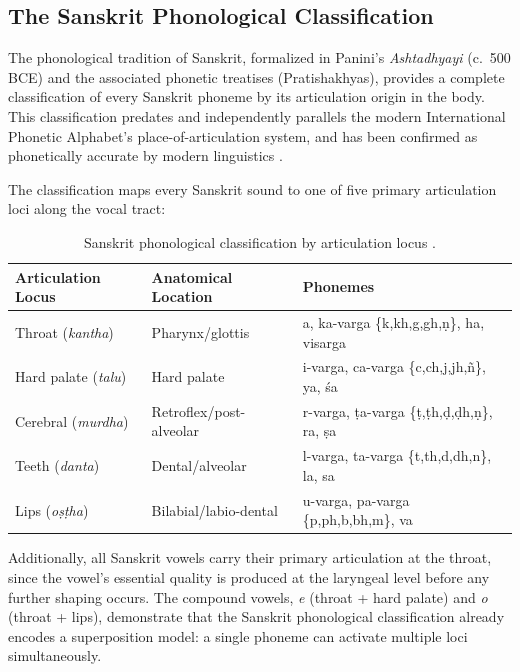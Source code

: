 \documentclass[12pt]{article}
\begin{document}
\subsection{The Sanskrit Phonological Classification}

The phonological tradition of Sanskrit, formalized in Panini's \textit{Ashtadhyayi} (c.\ 500 BCE) \cite{cardona1997} and the associated phonetic treatises (Pratishakhyas), provides a complete classification of every Sanskrit phoneme by its articulation origin in the body. This classification predates and independently parallels the modern International Phonetic Alphabet's place-of-articulation system, and has been confirmed as phonetically accurate by modern linguistics \cite{allen1953}.

The classification maps every Sanskrit sound to one of five primary articulation loci along the vocal tract:

\begin{table}[htbp]
\centering
\renewcommand{\arraystretch}{1.3}
\begin{tabular}{lll}
\toprule
\textbf{Articulation Locus} & \textbf{Anatomical Location} & \textbf{Phonemes} \\
\midrule
Throat (\textit{kantha}) & Pharynx/glottis & a, ka-varga \{k,kh,g,gh,\d{n}\}, ha, visarga \\
Hard palate (\textit{talu}) & Hard palate & i-varga, ca-varga \{c,ch,j,jh,\~{n}\}, ya, \'{s}a \\
Cerebral (\textit{murdha}) & Retroflex/post-alveolar & r-varga, \d{t}a-varga \{\d{t},\d{t}h,\d{d},\d{d}h,\d{n}\}, ra, \d{s}a \\
Teeth (\textit{danta}) & Dental/alveolar & l-varga, ta-varga \{t,th,d,dh,n\}, la, sa \\
Lips (\textit{o\d{s}\d{t}ha}) & Bilabial/labio-dental & u-varga, pa-varga \{p,ph,b,bh,m\}, va \\
\bottomrule
\end{tabular}
\caption{Sanskrit phonological classification by articulation locus \cite{panini500bce, allen1953}.}
\end{table}

Additionally, all Sanskrit vowels carry their primary articulation at the throat, since the vowel's essential quality is produced at the laryngeal level before any further shaping occurs. The compound vowels, \textit{e} (throat + hard palate) and \textit{o} (throat + lips), demonstrate that the Sanskrit phonological classification already encodes a superposition model: a single phoneme can activate multiple loci simultaneously.
\end{document}
